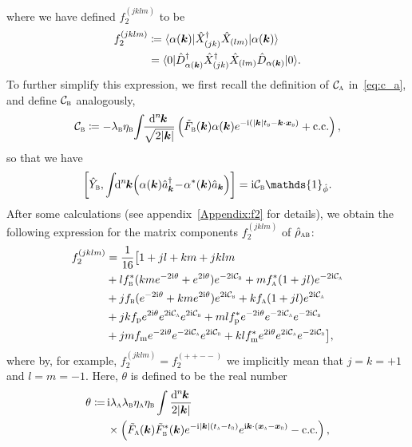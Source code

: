\documentclass[pra,nofootinbib,floats,aps,twocolumn,tightenlines,superscriptaddress]{revtex4-1}
\renewcommand*\d[2][]{%
	\mathrm{d}%
	\ifx\relax#1\relax\else
	\rule{-0.02em}{1.5ex}^{#1}\rule{0.08em}{0ex}\!
	\fi
	#2\,
}
\newcommand{\ket}[1]{| {#1} \rangle}
\newcommand{\bra}[1]{\langle {#1} |}
\newcommand{\ii}{\mathrm{i}}
\renewcommand{\a}[1]{\hat{a}_{\bm{#1}}}
\newcommand{\ad}[1]{\hat{a}_{\bm{#1}}^\dagger}
\newcommand{\rhoab}{\hat{\rho}_\textsc{ab}}
\newcommand{\Yb}{\hat{Y}_\textsc{b}}
\newcommand{\alphak}{\ket{\alpha(\bm k)}}
\newcommand{\alphab}{\bra{\alpha(\bm k)}}
\newcommand{\disp}{\hat{D}_{\alpha(\bm{k})}}
\newcommand{\ca}{\mathcal{C}_\textsc{a}}
\newcommand{\cb}{\mathcal{C}_\textsc{b}}
\newcommand{\fa}{f_\textsc{a}}
\newcommand{\fb}{f_\textsc{b}}
\newcommand{\fp}{f_\text{p}}
\newcommand{\fm}{f_\text{m}}
\begin{document}
where we have defined $f_2^{(jklm)}$ to be
\begin{align}
\label{eq:f2_def}
    f_2^{(jklm)}
    &\coloneqq
    \alphab
    \hat{X}_{(jk)}^\dagger
    \hat{X}_{(lm)}
    \alphak
    \notag\\
    &=
    \bra{0}\disp^\dagger
    \hat{X}_{(jk)}^\dagger
    \hat{X}_{(lm)}
    \disp\ket{0}.
\end{align}
To further simplify this expression, we first recall the definition of $\ca$ in~\eqref{eq:c_a}, and define $\cb$ analogously,
\begin{equation}
\label{eq:c_b}
    \cb
    \coloneqq
    -\lambda_\textsc{b}
    \eta_\textsc{b}\!
    \int\!\!
    \frac{\d[n]{\bm k}} {\sqrt{2|\bm{k}|}}
    \left(
    \tilde{F}_\textsc{b}(\bm k)
    \alpha(\bm k)
    e^{-\ii(|\bm k|t_\textsc{b} -\bm{k}\cdot \bm{x}_\textsc{b})}
    +\text{c.c.}
    \right),
\end{equation}
so that we have
\begin{align}
    \left[
    \Yb,
    \int\!\!\d[n]{\bm{k}}\!\!\left(\alpha(\bm{k})\ad{k}
	\!-\!
	\alpha^*(\bm{k})\a{k}\right)
	\right]=\ii\cb \mathds{1}_{\hat{\phi}}.
\end{align}
After some calculations (see appendix~\ref{Appendix:f2} for details), we obtain the following expression for the matrix components $f_2^{(jklm)}$ of $\rhoab$:
\begin{align}
\label{eq:f2}
    f_2^{(jklm)}
    &=
    \frac{1}{16}
    \big[
    1+jl+km+jklm
    \notag\\
    &+l\fb^*(kme^{-2\ii\theta}+e^{2\ii\theta}) e^{-2\ii\cb}
    +m\fa^*(1+jl) e^{-2\ii\ca}
    \notag\\ 
    &+j\fb(e^{-2\ii\theta}+kme^{2\ii\theta}) e^{2\ii\cb}
    +k\fa(1+jl) e^{2\ii\ca}
    \notag\\
    &+jk\fp e^{2\ii\theta} e^{2\ii\ca}e^{2\ii\cb}
    +ml\fp^*e^{-2\ii\theta} e^{-2\ii\ca}e^{-2\ii\cb}
    \notag\\
    &+jm\fm e^{-2\ii\theta} e^{-2\ii\ca}e^{2\ii\cb}
    +kl\fm^* e^{2\ii\theta} e^{2\ii\ca}e^{-2\ii\cb}
    \big],
\end{align}
where by, for example, $f_2^{(jklm)}=f_2^{(++--)}$ we implicitly mean that $j=k=+1$ and $l=m=-1$. Here, $\theta$ is defined to be the real number
\begin{align}
\label{eq:theta}
    \theta
    \coloneqq\,
    & \ii\lambda_\textsc{a}
    \lambda_\textsc{b}
    \eta_\textsc{a}
    \eta_\textsc{b}
    \int\frac{\d[n]{\bm k}}{2|\bm{k}|}
    \notag\\
    &\times
    \left(
    \tilde{F}_\textsc{a}(\bm k)
    \tilde{F}_\textsc{b}^*(\bm k)
    e^{-\ii|\bm{k}|(t_\textsc{a}-t_\textsc{b})}
    e^{\ii\bm{k}\cdot (\bm{x}_\textsc{a}-\bm{x}_\textsc{b})}
    -\text{c.c.}
    \right),
\end{align}
\end{document}
